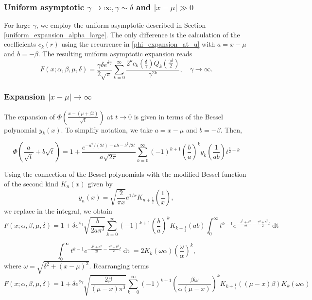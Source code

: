 \documentclass[10pt,a4paper,oneside]{article}
\numberwithin{equation}{section}
\begin{document}
\subsubsection{Uniform asymptotic $\gamma \to \infty, \gamma \sim \delta$ and $|x-\mu| \gg 0$}
For large $\gamma$, we employ the uniform asymptotic described in Section \ref{uniform_expansion_alpha_large}. The only difference is the calculation of the coefficients $c_k(r)$ using the recurrence in \eqref{phi_expansion_at_u} with $a = x-\mu$ and $b = -\beta$. The resulting uniform asymptotic expansion reads
\begin{equation}
F(x; \alpha, \beta, \mu, \delta) = \frac{\gamma \delta e^{\delta \gamma}}{2\sqrt{\pi}} \sum_{k=0}^{\infty} \frac{2^k c_k\left(\frac{\delta}{\gamma}\right) Q_k\left(\frac{\gamma\delta}{2}\right)}{\gamma^{2k}}, \quad \gamma \to \infty.
\end{equation}


\subsubsection{Expansion $|x-\mu| \to \infty$}

The expansion of $\Phi\left(\frac{x-(\mu + \beta t)}{\sqrt{t}}\right)$ at $t\to 0$ is given in terms of the Bessel polynomial $y_k(x)$. To simplify notation, we take $a = x-\mu$ and $b=-\beta$. Then,

\begin{equation}
\Phi\left(\frac{a}{\sqrt{t}} + b\sqrt{t}\right) = 1 + \frac{e^{-a^2/(2t) -ab - b^2/2 t}}{a\sqrt{2\pi}}\sum_{k=0}^{\infty} (-1)^{k+1} \left(\frac{b}{a}\right)^k y_k\left(\frac{1}{ab}\right) t^{\frac{1}{2} + k}
\end{equation}

Using the connection of the Bessel polynomials with the modified Bessel function of the second kind $K_n(x)$ given by
\begin{equation}
y_n(x) = \sqrt{\frac{2}{\pi x}}e^{1/x} K_{n + \frac{1}{2}}\left(\frac{1}{x}\right),
\end{equation}
we replace in the integral, we obtain
\begin{equation}
F(x; \alpha, \beta, \mu, \delta) = 1 + \delta e^{\delta \gamma} \sqrt{\frac{b}{2a\pi^3}}\sum_{k=0}^{\infty} (-1)^{k+1} \left(\frac{b}{a}\right)^k K_{k + \frac{1}{2}}(ab)\int_0^{\infty}t^{k-1} e^{-\frac{\delta^2 + a^2}{2t} -\frac{\gamma^2 + b^2}{2}t} \mathop{dt}
\end{equation}

\begin{equation}
\int_0^{\infty}t^{k-1} e^{-\frac{\delta^2 + a^2}{2t} -\frac{\gamma^2 + b^2}{2}t} \mathop{dt} = 2 K_k(\omega \alpha) \left(\frac{\omega}{\alpha}\right)^k,
\end{equation}
where $\omega = \sqrt{\delta^2 + (x-\mu)^2}$. Rearranging terms
\begin{equation}
F(x; \alpha, \beta, \mu, \delta) = 1 + \delta e^{\delta \gamma} \sqrt{\frac{2\beta}{(\mu-x)\pi^3}}\sum_{k=0}^{\infty} (-1)^{k+1} \left(\frac{\beta \omega}{\alpha(\mu-x)}\right)^k K_{k + \frac{1}{2}}((\mu-x)\beta) K_k(\omega \alpha)
\end{equation}
\end{document}
